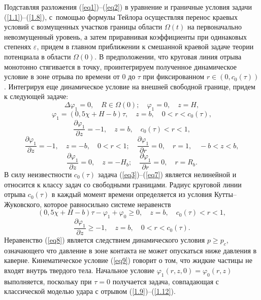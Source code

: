 \documentclass[press]{vestnik}
\begin{document}
Подставляя разложения (\ref{eq1})--(\ref{eq2}) в уравнение и граничные условия задачи 
(\ref{1.1})--(\ref{1.8}),  с~помощью формулы Тейлора осуществляя перенос краевых 
условий с возмущенных участков границы области $\Omega (t)$ на первоначально 
невозмущенный уровень, а затем приравнивая коэффициенты при одинаковых 
степенях $\varepsilon $, придем в главном приближении к смешанной краевой 
задаче теории потенциала в области $\Omega (0)$. В предположении, что 
круговая линия отрыва монотонно стягивается в точку, проинтегрируем 
полученное динамическое условие в зоне отрыва по времени от $0$ до $\tau $ 
при фиксированном $r\in (0,c_{0} (\tau ))$. Интегрируя еще динамическое 
условие на внешней свободной границе, придем к следующей задаче:
\begin{equation}
\label{eq3}
\Delta \varphi_{1} =0,
\quad
R\in \Omega (0);
\quad
\varphi_{1} =0,
\quad
z=H,
\end{equation}
\begin{equation}
\label{eq4}
\varphi_{1} =(0,5\chi +H-b)\tau ,
\quad
z=b,
\quad
0<r<c_{0} (\tau ),
\end{equation}
\begin{equation}
\label{eq5}
\frac{\partial \varphi_{1} }{\partial z}=-1,
\quad
z=b,
\quad
c_{0} (\tau )<r<1,
\end{equation}
\begin{equation}
\label{eq6}
\frac{\partial \varphi_{1} }{\partial z}=-1,
\quad
z=-b,
\quad
0<r<1;
\quad
\frac{\partial \varphi_{1} }{\partial r}=0,
\quad
r=1,
\quad
-b<z<b,
\end{equation}
\begin{equation}
\label{eq7}
\frac{\partial \varphi_{1} }{\partial z}=0,
\quad
z=-H_{b} ;
\quad
\frac{\partial \varphi_{1} }{\partial r}=0,
\quad
r=R_{b} .
\end{equation}
В силу неизвестности $c_{0} (\tau )$ задача (\ref{eq3})--(\ref{eq7}) является 
нелинейной и относится к классу задач со свободными границами. Радиус 
круговой линии отрыва $c_{0} (\tau )$ в каждый момент времени определяется 
из условия Кутты--Жуковского, которое равносильно системе неравенств
\begin{equation}
\label{eq8}
(0,5\chi +H-b)\tau -\varphi_{1} +\varphi_{0} \geqslant 0,
\quad
z=b,
\quad
c_{0} (\tau )<r<1,
\end{equation}
\begin{equation}
\label{eq9}
\frac{\partial \varphi_{1} }{\partial z}\geqslant -1,
\quad
z=b,
\quad
0<r<c_{0} (\tau ).
\end{equation}
Неравенство (\ref{eq8}) является следствием динамического условия $p\geqslant p_{c} $, 
означающего что давление в зоне контакта не может опускаться ниже давления в 
каверне. Кинематическое условие (\ref{eq9}) говорит о том, что жидкие частицы не 
входят внутрь твердого тела. Начальное условие $\varphi_{1} (r,z,0)=\varphi_{0} 
(r,z)$ выполняется, поскольку при $\tau =0$ получается задача, совпадающая с 
классической моделью удара с отрывом (\ref{1.9})--(\ref{1.12}).
\end{document}
